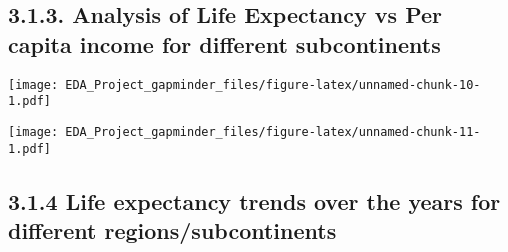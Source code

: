 \documentclass[]{article}
\newenvironment{Shaded}{\begin{snugshade}}{\end{snugshade}}
\newcommand{\KeywordTok}[1]{\textcolor[rgb]{0.13,0.29,0.53}{\textbf{#1}}}
\newcommand{\DataTypeTok}[1]{\textcolor[rgb]{0.13,0.29,0.53}{#1}}
\newcommand{\StringTok}[1]{\textcolor[rgb]{0.31,0.60,0.02}{#1}}
\newcommand{\OperatorTok}[1]{\textcolor[rgb]{0.81,0.36,0.00}{\textbf{#1}}}
\newcommand{\NormalTok}[1]{#1}
\begin{document}
\subsection{3.1.3. Analysis of Life Expectancy vs Per capita income for
different
subcontinents}\label{analysis-of-life-expectancy-vs-per-capita-income-for-different-subcontinents}

\begin{Shaded}
\end{Shaded}

\texttt{[image: EDA\_Project\_gapminder\_files/figure-latex/unnamed-chunk-10-1.pdf]}

\begin{Shaded}
\end{Shaded}

\texttt{[image: EDA\_Project\_gapminder\_files/figure-latex/unnamed-chunk-11-1.pdf]}

\subsection{3.1.4 Life expectancy trends over the years for different
regions/subcontinents}\label{life-expectancy-trends-over-the-years-for-different-regionssubcontinents}
\end{document}
